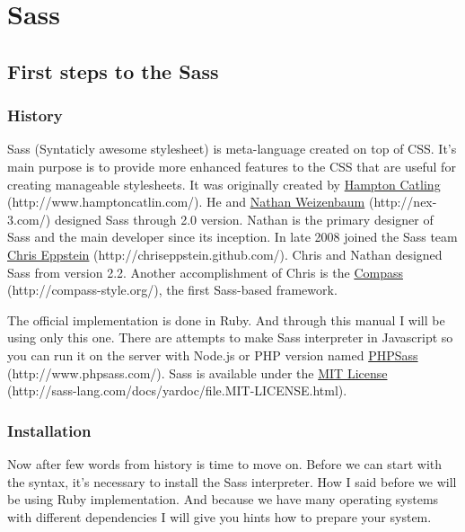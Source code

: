 \documentclass[a4paper,12pt,oneside]{sphinxmanual}
\begin{document}
\chapter{Sass}
\label{src/sass:table-of-content}\label{src/sass::doc}\label{src/sass:sass}

\section{First steps to the Sass}
\label{src/sass:first-steps-to-the-sass}

\subsection{History}
\label{src/sass:history}
Sass (Syntaticly awesome stylesheet) is meta-language created on top of CSS. It's main purpose is to provide more enhanced features to the CSS that are useful for creating manageable stylesheets. It was originally created by \href{http://www.hamptoncatlin.com/}{Hampton Catling} (http://www.hamptoncatlin.com/). He and \href{http://nex-3.com/}{Nathan Weizenbaum} (http://nex-3.com/) designed Sass through 2.0 version. Nathan is the primary designer of Sass and the main developer since its inception. In late 2008 joined the Sass team \href{http://chriseppstein.github.com/}{Chris Eppstein} (http://chriseppstein.github.com/). Chris and Nathan designed Sass from version 2.2. Another accomplishment of Chris is the \href{http://compass-style.org/}{Compass} (http://compass-style.org/), the first Sass-based framework.

The official implementation is done in Ruby. And through this manual I will be using only this one. There are attempts to make Sass interpreter in Javascript so you can run it on the server with Node.js or PHP version named \href{http://www.phpsass.com/}{PHPSass} (http://www.phpsass.com/). Sass is available under the \href{http://sass-lang.com/docs/yardoc/file.MIT-LICENSE.html}{MIT License} (http://sass-lang.com/docs/yardoc/file.MIT-LICENSE.html).


\subsection{Installation}
\label{src/sass:installation}
Now after few words from history is time to move on. Before we can start with the syntax, it's necessary to install the Sass interpreter. How I said before we will be using Ruby implementation. And because we have many operating systems with different dependencies I will give you hints how to prepare your system.
\end{document}
